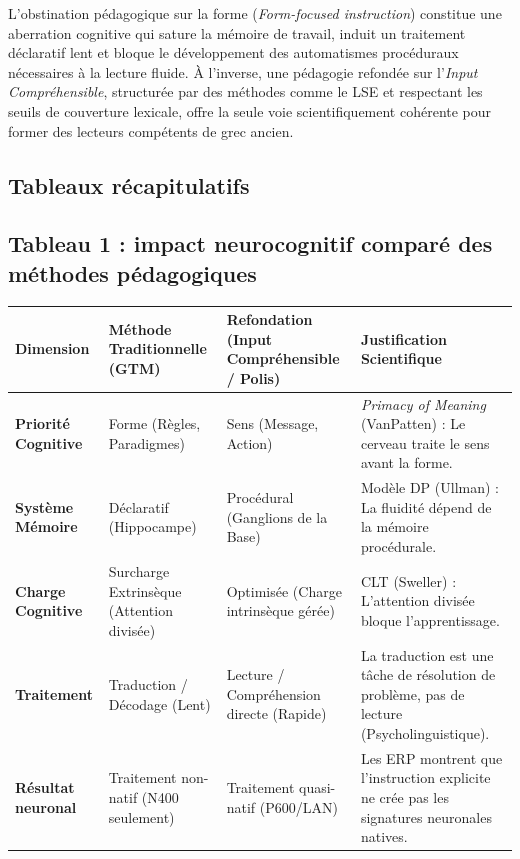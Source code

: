 L'obstination pédagogique sur la forme (\textit{Form-focused instruction}) constitue une aberration
cognitive qui sature la mémoire de travail, induit un traitement déclaratif lent et bloque le
développement des automatismes procéduraux nécessaires à la lecture fluide. À l'inverse, une
pédagogie refondée sur l'\textit{Input Compréhensible}, structurée par des méthodes comme le LSE et
respectant les seuils de couverture lexicale, offre la seule voie scientifiquement cohérente pour
former des lecteurs compétents de grec ancien.



\subsection{Tableaux récapitulatifs}



\subsection{Tableau 1 : impact neurocognitif comparé des méthodes pédagogiques}

\begin{table}[h!]\small\centering\begin{tabular}{| p{2cm} | p{2.2cm} | p{2.2cm} | p{2.2cm} |}\hline\textbf{Dimension} & \textbf{Méthode Traditionnelle (GTM)} & \textbf{Refondation (Input Compréhensible / Polis)} & \textbf{Justification Scientifique} \\ \hline\textbf{Priorité Cognitive} & Forme (Règles, Paradigmes) & Sens (Message, Action) & \textit{Primacy of Meaning} (VanPatten) : Le cerveau traite le sens avant la forme. \\ \hline\textbf{Système Mémoire} & Déclaratif (Hippocampe) & Procédural (Ganglions de la Base) & Modèle DP (Ullman) : La fluidité dépend de la mémoire procédurale. \\ \hline\textbf{Charge Cognitive} & Surcharge Extrinsèque (Attention divisée) & Optimisée (Charge intrinsèque gérée) & CLT (Sweller) : L'attention divisée bloque l'apprentissage. \\ \hline\textbf{Traitement} & Traduction / Décodage (Lent) & Lecture / Compréhension directe (Rapide) & La traduction est une tâche de résolution de problème, pas de lecture (Psycholinguistique). \\ \hline\textbf{Résultat neuronal} & Traitement non-natif (N400 seulement) & Traitement quasi-natif (P600/LAN) & Les ERP montrent que l'instruction explicite ne crée pas les signatures neuronales natives.\cite{II-3-3-ref27} \\ \hline\end{tabular}\end{table}

